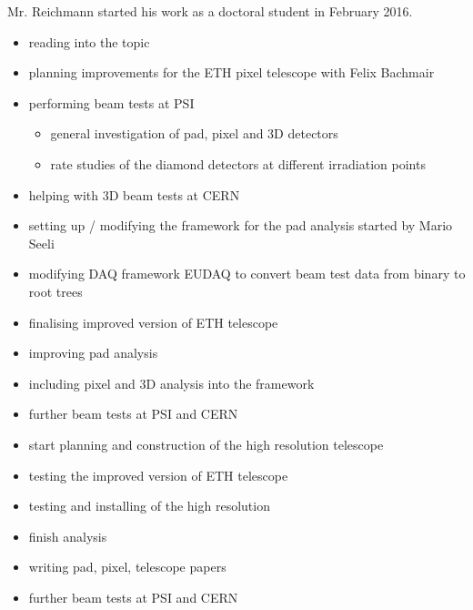 Mr. Reichmann started his work as a doctoral student in February 2016.\parsmall
{}
\begin{itemize}
  \item reading into the topic
  \item planning improvements for the ETH pixel telescope with Felix Bachmair
  \item performing beam tests at \ac{PSI}
  \begin{itemize}
    \item general investigation of pad, pixel and 3D detectors
    \item rate studies of the diamond detectors at different irradiation points
  \end{itemize}
  \item helping with 3D beam tests at CERN
  \item setting up / modifying the framework for the pad analysis started by Mario Seeli
  \item modifying \ac{DAQ} framework EUDAQ to convert beam test data from binary to root trees
\end{itemize}
\begin{itemize}
  \item finalising improved version of ETH telescope
  \item improving pad analysis
  \item including pixel and 3D analysis into the framework
  \item further beam tests at \ac{PSI} and CERN
  \item start planning and construction of the high resolution telescope
\end{itemize}
\begin{itemize}
  \item testing the improved version of ETH telescope
  \item testing and installing of the high resolution 
  \item finish analysis
  \item writing pad, pixel, telescope papers
  \item further beam tests at \ac{PSI} and CERN
\end{itemize}
\parend
